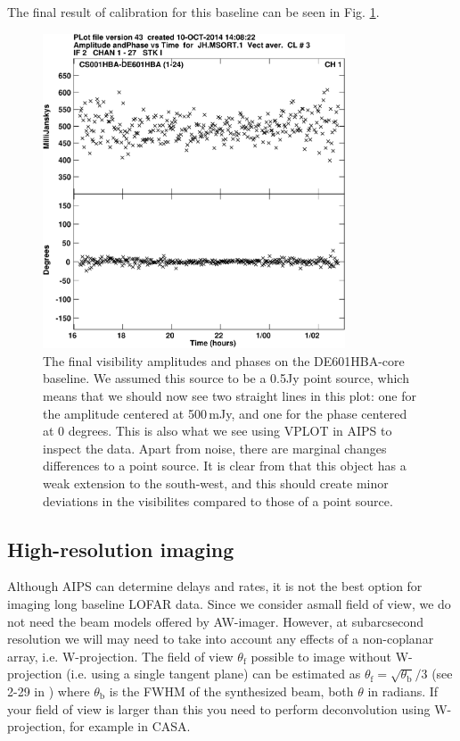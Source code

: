 The final result of calibration for this baseline can be seen in Fig. \ref{fig:vplot}.
\begin{figure}[htbp]
\centering
    \includegraphics[width=0.8\textwidth]{figs/J0958Hvplot-crop.pdf}
\caption{
The final visibility amplitudes and phases on the DE601HBA-core baseline. We assumed this source to be a 0.5Jy point source, which means that we should now see two straight lines
in this plot: one for the amplitude centered at 500\,mJy, and one for the phase centered at 0 degrees. This is also what we see using VPLOT in AIPS to inspect the data. Apart from noise,
there are marginal changes differences to a point source. It is clear from \cite{varenius2014} that this object has a weak extension to the south-west, and this should create 
minor deviations in the visibilites compared to those of a point source.
\label{fig:vplot}
}
\end{figure}

\subsection{High-resolution imaging}
Although AIPS can determine delays and rates, it is not the best option for imaging long baseline LOFAR data. Since we consider asmall field of view, we do not need 
the beam models offered by AW-imager. However, at subarcsecond resolution we will may need to take into account any effects of a non-coplanar array, i.e. W-projection. The field of view $\theta_\mathrm{f}$
possible to image without W-projection (i.e. using a single tangent plane) can be estimated as $\theta_{\mathrm{f}} = \sqrt{\theta_{\mathrm{b}}}/3$ (see 2-29 in \cite{NRAO}) where $\theta_\mathrm{b}$
is the FWHM of the synthesized beam, both $\theta$ in radians. If your field of view is larger than this you need to perform deconvolution using W-projection, for example in CASA.

